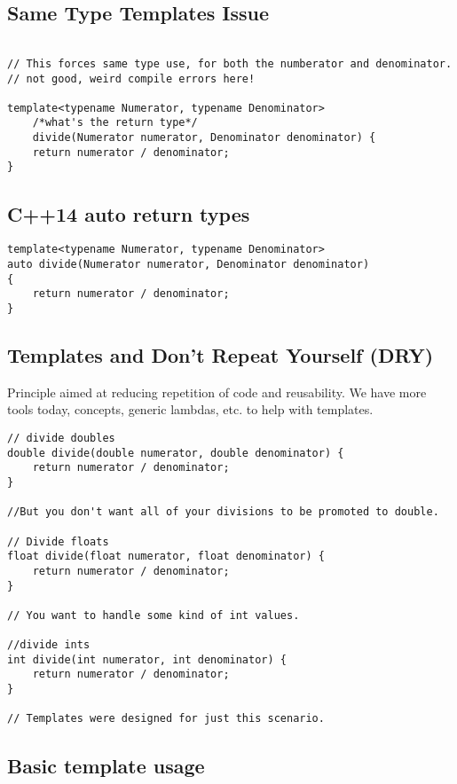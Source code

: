 \documentclass[openany]{report}
\begin{document}
\subsection{Same Type Templates Issue}

\begin{verbatim}

// This forces same type use, for both the numberator and denominator. 
// not good, weird compile errors here!

template<typename Numerator, typename Denominator>
    /*what's the return type*/
    divide(Numerator numerator, Denominator denominator) {
    return numerator / denominator;
}
\end{verbatim}

\subsection{C++14 auto return types}

\begin{verbatim}
template<typename Numerator, typename Denominator>
auto divide(Numerator numerator, Denominator denominator)
{
    return numerator / denominator;
}
\end{verbatim}

\subsection{Templates and Don't Repeat Yourself (DRY)}

Principle aimed at reducing repetition of code and reusability. 
We have more tools today, concepts, generic lambdas, etc. to help with templates.

\begin{verbatim}
// divide doubles
double divide(double numerator, double denominator) {
    return numerator / denominator;
}

//But you don't want all of your divisions to be promoted to double. 

// Divide floats
float divide(float numerator, float denominator) {
    return numerator / denominator;
}

// You want to handle some kind of int values. 

//divide ints
int divide(int numerator, int denominator) {
    return numerator / denominator;
}

// Templates were designed for just this scenario. 
\end{verbatim}

\subsection{Basic template usage}
\end{document}
